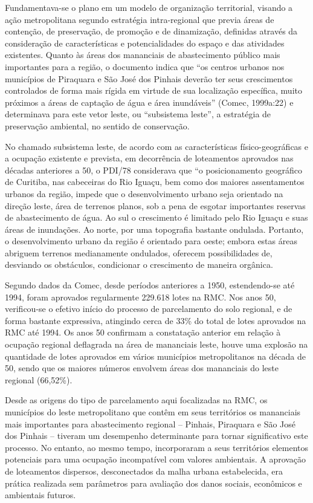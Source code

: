 	Fundamentava-se o plano em um modelo de organização territorial, visando a ação metropolitana segundo estratégia intra-regional que previa áreas de contenção, de preservação, de promoção e de dinamização, definidas através da consideração de características e potencialidades do espaço e das atividades existentes. Quanto às áreas dos mananciais de abastecimento público mais importantes para a região, o documento indica que “os centros urbanos nos municípios de Piraquara e São José dos Pinhais deverão ter seus crescimentos controlados de forma mais rígida em virtude de sua localização específica, muito próximos a áreas de captação de água e área inundáveis” (Comec, 1999a:22) e determinava para este vetor leste, ou “subsistema leste”, a estratégia de preservação ambiental, no sentido de conservação. 
	
	No chamado subsistema leste, de acordo com as características físico-geográficas e a ocupação existente e prevista, em decorrência de loteamentos aprovados nas décadas anteriores a 50, o PDI/78 considerava que “o posicionamento geográfico de Curitiba, nas cabeceiras do Rio Iguaçu, bem como dos maiores assentamentos urbanos da região, impede que o desenvolvimento urbano seja orientado na direção leste, área de terrenos planos, sob a pena de esgotar importantes reservas de abastecimento de água. Ao sul o crescimento é limitado pelo Rio Iguaçu e suas áreas de inundações. Ao norte, por uma topografia bastante ondulada. Portanto, o desenvolvimento urbano da região é orientado para oeste; embora estas áreas abriguem terrenos medianamente ondulados, oferecem possibilidades de, desviando os obstáculos, condicionar o crescimento de maneira orgânica.
	
	Segundo dados da Comec, desde períodos anteriores a 1950, estendendo-se até 1994, foram aprovados regularmente 229.618 lotes na RMC. Nos anos 50, verificou-se o efetivo início do processo de parcelamento do solo regional, e de forma bastante expressiva, atingindo cerca de 33\% do total de lotes aprovados na RMC até 1994. Os anos 50 confirmam a constatação anterior em relação à ocupação regional deflagrada na área de mananciais leste,  houve uma explosão na quantidade de lotes aprovados em vários municípios metropolitanos na década de 50, sendo que os maiores números envolvem áreas dos mananciais do leste regional (66,52\%).
	
	Desde as origens do tipo de parcelamento aqui focalizadas na RMC, os municípios do leste metropolitano que contêm em seus territórios os mananciais mais importantes para abastecimento regional – Pinhais, Piraquara e São José dos Pinhais – tiveram um desempenho determinante para tornar significativo este processo. No entanto, ao mesmo tempo, incorporaram a seus territórios elementos potenciais para uma ocupação incompatível com valores ambientais. A aprovação de loteamentos dispersos, desconectados da malha urbana estabelecida, era prática realizada sem parâmetros para avaliação dos danos sociais, econômicos e ambientais futuros.
	
